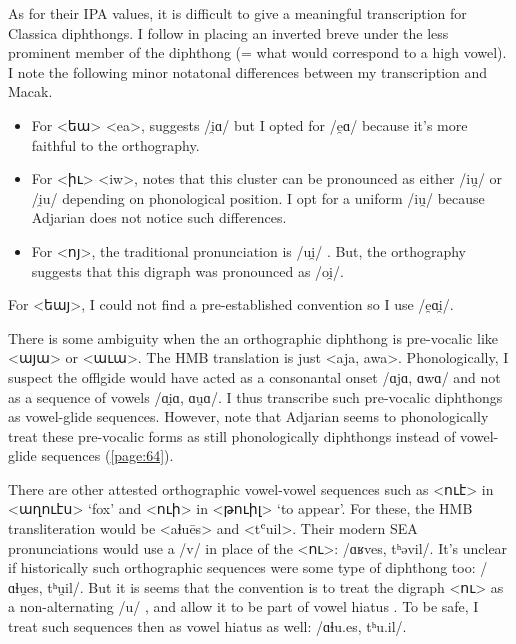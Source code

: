 As for their IPA values, it is difficult to give a meaningful transcription for Classica diphthongs. I follow \citet{Macak-2017-PhonoClassicalArmenian} in placing an inverted breve under the less prominent member of the diphthong (= what would correspond to a high vowel). I note the following minor notatonal differences between my transcription and Macak. 

\begin{itemize}
		\item For <եա> <ea>, \citet[1041,1043]{Macak-2017-PhonoClassicalArmenian} suggests /i̯ɑ/ but I opted for /e̯ɑ/ because it's more faithful to the orthography. 
		\item For <իւ> <iw>, \citet[1041,1043]{Macak-2017-PhonoClassicalArmenian} notes that this cluster can be pronounced as either /iu̯/ or /i̯u/ depending on phonological position. I opt for a uniform /iu̯/ because Adjarian does not notice such differences.
		\item For <ոյ>, the traditional pronunciation is /ui̯/ \citep[1039]{Macak-2017-PhonoClassicalArmenian}. But, the orthography suggests that this digraph was pronounced as /oi̯/. 
\end{itemize}

For <եայ>, I could not find a pre-established convention so I use /e̯ɑi̯/. 
	
There is some ambiguity when the an orthographic diphthong is pre-vocalic like <այա> or <աւա>. The HMB translation is just <aja, awa>. Phonologically, I suspect the offlgide would have acted as a consonantal onset /ɑjɑ, ɑwɑ/ and not as a sequence of vowels /ɑi̯ɑ, ɑu̯ɑ/. I thus transcribe such pre-vocalic diphthongs as vowel-glide sequences. However, note that Adjarian seems to phonologically treat these pre-vocalic forms as still phonologically diphthongs instead of vowel-glide sequences (\ref{page:64}). 




There are other attested orthographic vowel-vowel sequences such as <ուէ> in <աղուէս> `fox' and <ուի> in <թուիլ> `to appear'. For these, the HMB transliteration would be <aɬuēs> and <tʿuil>. Their modern SEA pronunciations would use a /v/ in place of the <ու>: /ɑʁves, tʰəvil/. It's unclear if historically such orthographic sequences were some type of diphthong too: /ɑɬu̯es, tʰu̯il/. But it is seems that the convention is to treat the digraph <ու> as a non-alternating /u/ \citep[15]{Thomson-1989-IntroClassicalArmenian}, and allow it to be part of vowel hiatus \citep[17]{Thomson-1989-IntroClassicalArmenian}. To be safe, I treat such sequences then as vowel hiatus as well: /ɑɬu.es, tʰu.il/.


